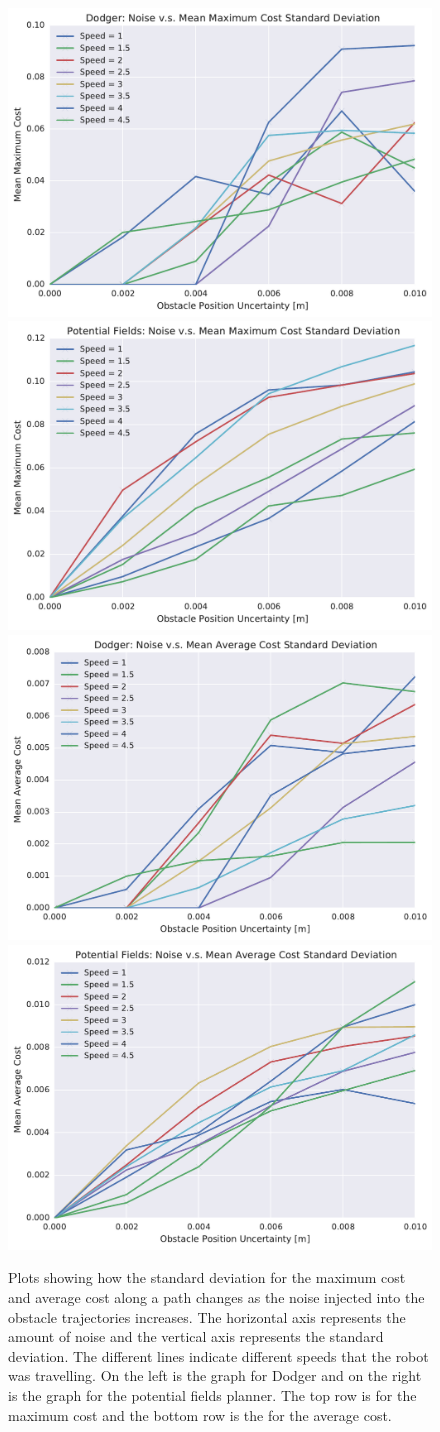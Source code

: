 \documentclass[letterpaper, 10pt, conference]{ieeeconf}
\begin{document}
\begin{figure}[h!]
    \centering
    \includegraphics[width=0.48\linewidth]{figs/planner_std_max_cost_0}
    \includegraphics[width=0.48\linewidth]{figs/pf_std_max_cost_0} \\
    \includegraphics[width=0.48\linewidth]{figs/planner_std_avg_cost_0}
    \includegraphics[width=0.48\linewidth]{figs/pf_std_avg_cost_0}

    \caption{Plots showing how the standard deviation for the maximum cost and
        average cost along a path changes as the noise injected into the
        obstacle trajectories increases. The horizontal axis represents the
        amount of noise and the vertical axis represents the standard
        deviation. The different lines indicate different speeds that the robot
        was travelling. On the left is the graph for Dodger and on the right is
    the graph for the potential fields planner. The top row is for the maximum
cost and the bottom row is the for the average cost.}

    \label{fig:plot_std_cost}
\end{figure}
\end{document}
